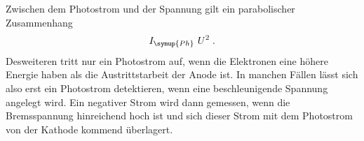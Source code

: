 Zwischen dem Photostrom und der Spannung gilt ein parabolischer Zusammenhang
\begin{equation*}
    I_{\symup{Ph}} ~ U^2 \; .
\end{equation*}
Desweiteren tritt nur ein Photostrom auf, wenn die Elektronen eine höhere Energie haben als die Austrittstarbeit 
der Anode ist. In manchen Fällen lässt sich also erst ein Photostrom detektieren, wenn eine beschleunigende 
Spannung angelegt wird. Ein negativer Strom wird dann gemessen, wenn die Bremsspannung hinreichend hoch 
ist und sich dieser Strom mit dem Photostrom von der Kathode kommend überlagert.